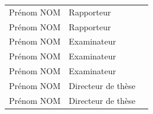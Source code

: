 \begin{titlepage}
\vspace{0.2cm} \normalsize
\begin{center}
\begin{tabular}{lll}
	Prénom NOM & Rapporteur \\
    \vspace{0.1cm}
	Prénom NOM & Rapporteur \\
    \vspace{0.1cm}
	Prénom NOM & Examinateur \\
    \vspace{0.1cm}
	Prénom NOM & Examinateur \\
	\vspace{0.1cm}
	Prénom NOM & Examinateur \\
    \vspace{0.1cm}
	Prénom NOM & Directeur de thèse \\
    \vspace{0.1cm}
    Prénom NOM & Directeur de thèse \\
\end{tabular}
\end{center}
\end{titlepage}
